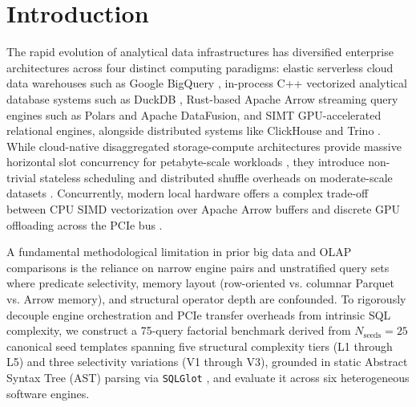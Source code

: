 \documentclass[10pt,a4paper]{article}
\begin{document}
\section{Introduction}
The rapid evolution of analytical data infrastructures has diversified enterprise architectures across four distinct computing paradigms: elastic serverless cloud data warehouses such as Google BigQuery \cite{melnik2010dremel,melnik2020dremel,lounissi2025funda}, in-process C++ vectorized analytical database systems such as DuckDB \cite{raasveldt2019duckdb}, Rust-based Apache Arrow streaming query engines such as Polars and Apache DataFusion, and SIMT GPU-accelerated relational engines, alongside distributed systems like ClickHouse \cite{schulze2024clickhouse} and Trino \cite{sethi2019presto}. While cloud-native disaggregated storage-compute architectures provide massive horizontal slot concurrency for petabyte-scale workloads \cite{shojaee2024serverless,abdalla2022bigdata}, they introduce non-trivial stateless scheduling and distributed shuffle overheads on moderate-scale datasets \cite{begoli2018calcite,garcia2008database,lounissi2025funda}. Concurrently, modern local hardware offers a complex trade-off between CPU SIMD vectorization over Apache Arrow buffers and discrete GPU offloading across the PCIe bus \cite{milicevic2024dlquery}.

A fundamental methodological limitation in prior big data and OLAP comparisons \cite{ahmed2020hibench,abdalla2022bigdata} is the reliance on narrow engine pairs and unstratified query sets where predicate selectivity, memory layout (row-oriented vs. columnar Parquet vs. Arrow memory), and structural operator depth are confounded. To rigorously decouple engine orchestration and PCIe transfer overheads from intrinsic SQL complexity, we construct a 75-query factorial benchmark derived from $N_{\text{seeds}}=25$ canonical seed templates spanning five structural complexity tiers (L1 through L5) and three selectivity variations (V1 through V3), grounded in static Abstract Syntax Tree (AST) parsing via \texttt{SQLGlot} \cite{mao2024sqlglot}, and evaluate it across six heterogeneous software engines.

\end{document}
